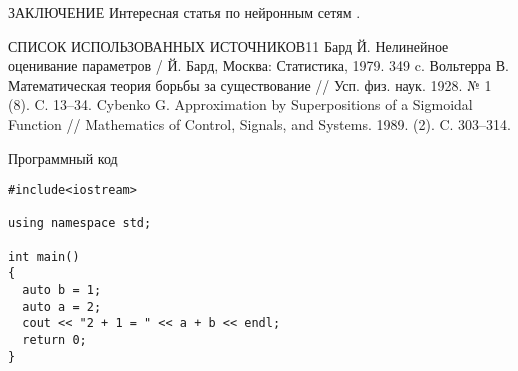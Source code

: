 \documentclass[14pt, a4paper, oneside, final]{extarticle}
\begin{document}
\begin{gostheader}{ЗАКЛЮЧЕНИЕ}
Интересная статья по нейронным сетям \cite{Cybenko}.
\end{gostheader}


%
%

\begin{gostbibliography}{СПИСОК ИСПОЛЬЗОВАННЫХ ИСТОЧНИКОВ}{11}
 Бард Й. Нелинейное оценивание параметров / Й. Бард, Москва: Статистика, 1979. 349 c.
 Вольтерра В. Математическая теория борьбы за существование // Усп. физ. наук. 1928. № 1 (8). C. 13–34.
 Cybenko G. Approximation by Superpositions of a Sigmoidal Function // Mathematics of Control, Signals, and Systems. 1989. (2). C. 303–314.
\end{gostbibliography}



\begin{gostappendix}{Программный код}
\lstset{language=[11]c++,basicstyle=\ttfamily, showstringspaces=false}

\begin{lstlisting}
#include<iostream>

using namespace std;

int main()
{
  auto b = 1;
  auto a = 2;
  cout << "2 + 1 = " << a + b << endl;
  return 0;
}
\end{lstlisting}

\end{gostappendix}
\end{document}
